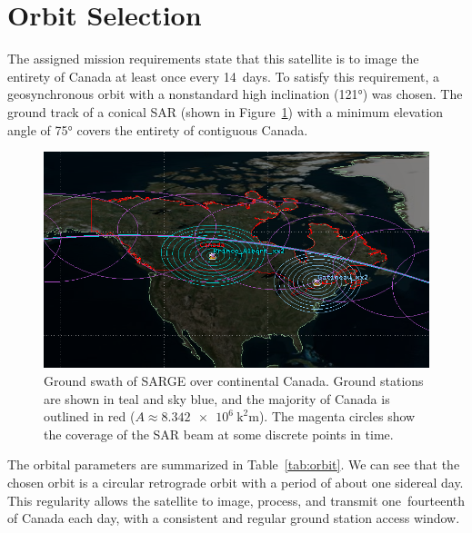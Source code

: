 \documentclass[9pt]{article}
\begin{document}
\section{Orbit Selection}
The assigned mission requirements state that this satellite is to image the entirety of Canada at least once every 14~days.
To satisfy this requirement, a geosynchronous orbit with a nonstandard high inclination (\ang{121}) was chosen.
The ground track of a conical SAR (shown in Figure~\ref{fig:groundtrack}) with a minimum elevation angle of \ang{75} covers the entirety of contiguous Canada.

\begin{figure}[hb]
  \centering
  \includegraphics[width=12cm]{groundtrack}
  \caption{Ground swath of SARGE over continental Canada. Ground stations are shown in teal and sky blue, and the majority of Canada is outlined in red ($A\approx\qty{8.342e6}{\square\kilo\metre}$). The magenta circles show the coverage of the SAR beam at some discrete points in time.}
  \label{fig:groundtrack}
\end{figure}

The orbital parameters are summarized in Table~\ref{tab:orbit}.
We can see that the chosen orbit is a circular retrograde orbit with a period of about one sidereal day.
This regularity allows the satellite to image, process, and transmit one~fourteenth of Canada each day, with a consistent and regular ground station access window.
\end{document}
